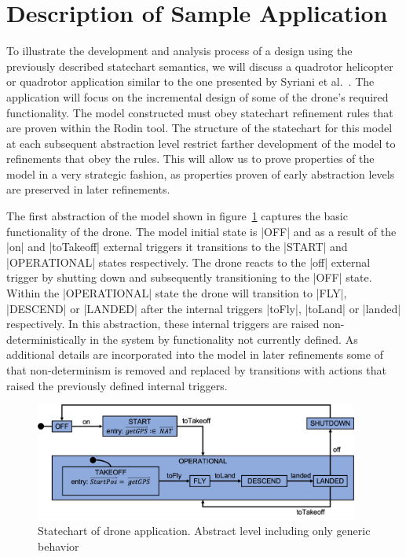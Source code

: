 

\section{Description of Sample Application}

To illustrate the development and analysis process of a design using the previously described 
statechart semantics, we will discuss a quadrotor helicopter or quadrotor application similar to 
the one presented by Syriani et al.~\cite{Syriani_2019}. The application will focus on the incremental 
design of some of the drone's required functionality.
The model constructed must obey statechart refinement rules that are proven within the Rodin tool.
The structure of the statechart for this model at each subsequent abstraction level restrict farther 
development of the model to refinements that obey the rules. This will allow us to prove properties 
of the model in a very strategic fashion, as properties proven of early abstraction levels 
are preserved in later refinements.

The first abstraction of the model shown in figure~\ref{fig:drone1} captures the basic 
functionality of the drone. The model initial state is |OFF| and as a result of the |on| and 
|toTakeoff| external triggers it transitions to the |START| and |OPERATIONAL| states respectively. 
The drone reacts to the |off| external trigger by shutting down and subsequently transitioning to the |OFF| state.
Within the |OPERATIONAL| state the drone will transition to |FLY|, |DESCEND| or |LANDED| 
after the internal triggers |toFly|, |toLand| or |landed| respectively. 
In this abstraction, these internal triggers are raised non-deterministically 
in the system by functionality not currently defined.
As additional details are incorporated into the model in later refinements some of that non-determinism is 
removed and replaced by transitions with actions that raised the previously defined internal triggers.

\begin{figure}[!h]
	\vspace{-.4cm}
	\centering
	\includegraphics[width=0.95\textwidth]{figures/Picture1.png}
	\caption{Statechart of drone application. Abstract level including only generic behavior }
	\label{fig:drone1}
	\vspace{-.4cm}
\end{figure} 

